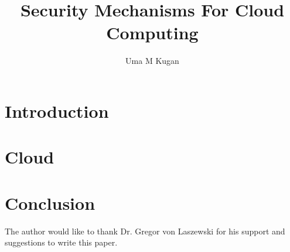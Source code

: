 
\title{Security Mechanisms For Cloud Computing}


\author{Uma M Kugan}

\renewcommand{\shortauthors}{Uma}


\begin{abstract}
\end{abstract}


\maketitle

\section{Introduction}

\section{Cloud}



\section{Conclusion}

\begin{acks}
  The author would like to thank Dr. Gregor von Laszewski for his
  support and suggestions to write this paper.

\end{acks}


 
